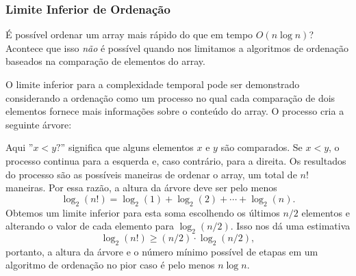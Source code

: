 \subsubsection{Limite Inferior de Ordenação}

É possível ordenar um array mais rápido
do que em tempo $O(n \log n)$?
Acontece que isso \emph{não} é possível
quando nos limitamos a algoritmos de ordenação baseados na comparação de elementos do array.

O limite inferior para a complexidade temporal
pode ser demonstrado considerando a ordenação
como um processo no qual cada comparação de dois elementos fornece mais informações sobre o conteúdo do array.
O processo cria a seguinte árvore:

\begin{center}
\end{center}

Aqui ''$x<y?$'' significa que alguns elementos
$x$ e $y$ são comparados.
Se $x<y$, o processo continua para a esquerda e,
caso contrário, para a direita.
Os resultados do processo são as possíveis
maneiras de ordenar o array, um total de $n!$ maneiras.
Por essa razão, a altura da árvore deve ser pelo menos
\[ \log_2(n!) = \log_2(1)+\log_2(2)+\cdots+\log_2(n).\]
Obtemos um limite inferior para esta soma
escolhendo os últimos $n/2$ elementos e
alterando o valor de cada elemento para $\log_2(n/2)$.
Isso nos dá uma estimativa
\[ \log_2(n!) \ge (n/2) \cdot \log_2(n/2),\]
portanto, a altura da árvore e o número mínimo possível de etapas em um algoritmo de ordenação no pior caso é pelo menos $n \log n$.


